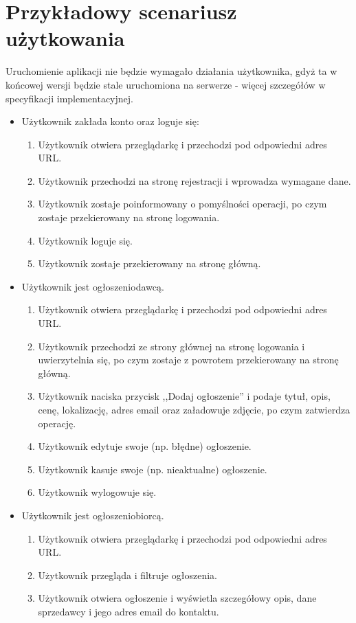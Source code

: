 \documentclass{article}
\begin{document}
\section{Przykładowy scenariusz użytkowania}
{\fontsize{12}{12}\selectfont

Uruchomienie aplikacji nie będzie wymagało działania użytkownika, gdyż ta w końcowej wersji będzie stale uruchomiona na serwerze - więcej szczegółów w specyfikacji implementacyjnej.

\begin{itemize}
    \item Użytkownik zakłada konto oraz loguje się:
        \begin{enumerate}
            \item Użytkownik otwiera przeglądarkę i przechodzi pod odpowiedni adres URL.
            \item Użytkownik przechodzi na stronę rejestracji i wprowadza wymagane dane.
            \item Użytkownik zostaje poinformowany o pomyślności operacji, po czym zostaje przekierowany na stronę logowania.
            \item Użytkownik loguje się.
            \item Użytkownik zostaje przekierowany na stronę główną.
        \end{enumerate}

    \item Użytkownik jest ogłoszeniodawcą.
            \begin{enumerate}
            \item Użytkownik otwiera przeglądarkę i przechodzi pod odpowiedni adres URL.
            \item Użytkownik przechodzi ze strony głównej na stronę logowania i uwierzytelnia się, po czym zostaje z powrotem przekierowany na stronę główną.
            \item Użytkownik naciska przycisk ,,Dodaj ogłoszenie'' i podaje tytuł, opis, cenę, lokalizację, adres email oraz załadowuje zdjęcie, po czym zatwierdza operację.
            \item Użytkownik edytuje swoje (np. błędne) ogłoszenie.
            \item Użytkownik kasuje swoje (np. nieaktualne) ogłoszenie.
            \item Użytkownik wylogowuje się.
        \end{enumerate}
        
    \item Użytkownik jest ogłoszeniobiorcą.
        \begin{enumerate}
            \item Użytkownik otwiera przeglądarkę i przechodzi pod odpowiedni adres URL.
            \item Użytkownik przegląda i filtruje ogłoszenia.
            \item Użytkownik otwiera ogłoszenie i wyświetla szczegółowy opis, dane sprzedawcy i jego adres email do kontaktu.
        \end{enumerate}
    \end{itemize}
    
}
\end{document}
